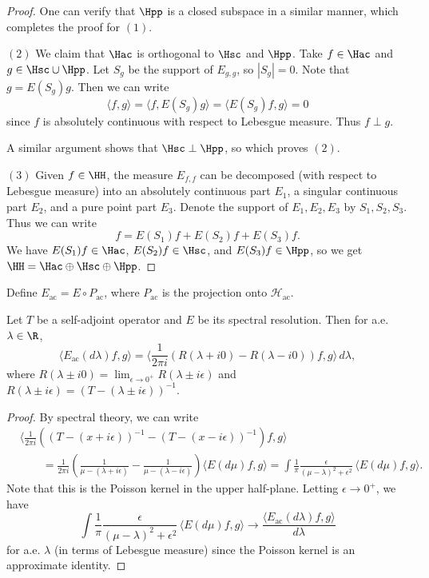\begin{proof}
  One can verify that $\Hpp$ is a closed subspace
  in a similar manner, which completes the proof for
  $(1)$.

  $(2)$ We claim that
  $\Hac$ is orthogonal to $\Hsc$ and $\Hpp$.
  Take $f \in \Hac$ and $g \in \Hsc \cup \Hpp$.
  Let $S_g$ be the support of $E_{g, g}$, so
  $|S_g| = 0$. Note that $g = E(S_g) g$. Then we can
  write
  \[
    \langle f, g \rangle
    = \langle f, E(S_g) g \rangle
    = \langle E(S_g) f, g \rangle = 0
  \]
  since $f$ is absolutely continuous with respect
  to Lebesgue measure. Thus $f \perp g$.

  A similar argument shows that
  $\Hsc \perp \Hpp$, so which proves $(2)$.

  $(3)$ Given $f \in \HH$, the measure $E_{f, f}$ can be
  decomposed (with respect to Lebesgue measure)
  into an absolutely continuous
  part $E_1$, a singular continuous part $E_2$, and
  a pure point part $E_3$. Denote the support of
  $E_1, E_2, E_3$ by $S_1, S_2, S_3$.
  Thus we can write
  \[
    f = E(S_1) f + E(S_2) f + E(S_3) f.
  \]
  We have $E(S_1) f \in \Hac$, $E(S_2) f \in \Hsc$,
  and $E(S_3) f \in \Hpp$, so we get
  $\HH = \Hac \oplus \Hsc \oplus \Hpp$.
\end{proof}

\begin{definition}
  Define $E_{\mathrm{ac}} = E \circ P_{\mathrm{ac}}$, where
  $P_{\mathrm{ac}}$ is the projection onto
  $\mathcal{H}_{\mathrm{ac}}$.
\end{definition}

\begin{lemma}
  Let $T$ be a self-adjoint operator and $E$ be its
  spectral resolution. Then for a.e. $\lambda \in \R$,
  \[
    \langle E_{\mathrm{ac}}(d\lambda) f, g \rangle
    = \langle \frac{1}{2\pi i} (R(\lambda + i0) - R(\lambda - i0)) f, g \rangle\, d \lambda,
  \]
  where $R(\lambda \pm i0) = \lim_{\epsilon \to 0^+} R(\lambda \pm i\epsilon)$
  and $R(\lambda \pm i \epsilon) = (T - (\lambda \pm i \epsilon))^{-1}$.
\end{lemma}

\begin{proof}
  By spectral theory, we can write
  \begin{align*}
    &\langle \frac{1}{2\pi i} ((T - (x + i\epsilon))^{-1} - (T - (x - i\epsilon))^{-1}) f, g \rangle \\
    & \quad \quad = \frac{1}{2\pi i} \left(\frac{1}{\mu - (\lambda + i\epsilon)} - \frac{1}{\mu - (\lambda - i\epsilon)}\right)
    \langle E(d\mu) f, g \rangle
    = \int \frac{1}{\pi} \frac{\epsilon}{(\mu - \lambda)^2 + \epsilon^2}\,  \langle E(d\mu) f, g \rangle.
  \end{align*}
  Note that this is the Poisson kernel in the
  upper half-plane. Letting $\epsilon \to 0^+$, we have
  \[
    \int \frac{1}{\pi} \frac{\epsilon}{(\mu - \lambda)^2 + \epsilon^2}\,  \langle E(d\mu) f, g \rangle
    \to \frac{\langle E_{\mathrm{ac}}(d\lambda) f, g \rangle}{d\lambda}
  \]
  for a.e. $\lambda$ (in terms of Lebesgue measure)
  since the Poisson kernel is an approximate identity.
\end{proof}

